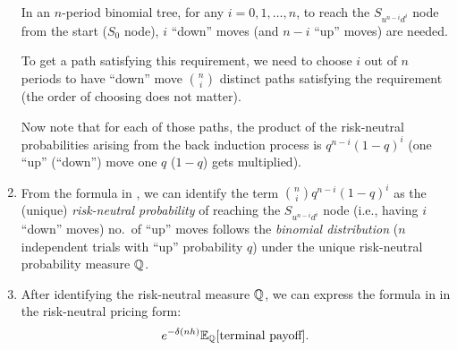 \begin{enumerate}
\begin{pf}
In an \(n\)-period binomial tree, for any \(i=0,1,\dotsc,n\), to reach the
\(S_{u^{n-i}d^{i}}\) node from the start (\(S_0\) node), \(i\) ``down'' moves
(and \(n-i\) ``up'' moves) are needed.

To get a path satisfying this requirement, we need to choose \(i\) out of \(n\)
periods to have ``down'' move  \(\binom{n}{i}\) distinct
paths satisfying the requirement (the order of choosing does not matter).

Now note that for each of those paths, the product of the risk-neutral
probabilities arising from the back induction process is \(q^{n-i}(1-q)^{i}\)
(one ``up'' (``down'') move  one \(q\) (\(1-q\)) gets
multiplied).
\end{pf}

\item From the formula in , we can
identify the term \(\binom{n}{i}q^{n-i}(1-q)^{i}\) as the (unique) \emph{risk-neutral
probability} of reaching the \(S_{u^{n-i}d^{i}}\) node (i.e., having \(i\)
``down'' moves)  no.\ of ``up'' moves follows
the \emph{binomial distribution} (\(n\) independent trials with ``up'' probability
\(q\)) under the unique risk-neutral probability measure \(\mathbb{Q}\).

\item \label{it:mult-period-rn-pricing-fmla}
After identifying the risk-neutral measure \(\mathbb{Q}\), we can express the formula
in  in the risk-neutral pricing form:
\begin{equation}
\label{eq:mult-period-rn-pricing-fmla}
e^{-\delta(nh)}\mathbb{E}_{\mathbb{Q}}\qty[\text{terminal payoff}].
\end{equation}
\end{enumerate}
